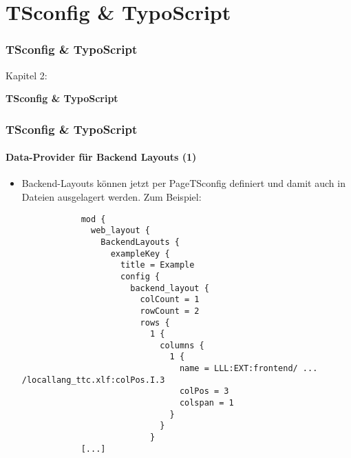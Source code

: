 %

\section{TSconfig \& TypoScript}
\begin{frame}[fragile]
	\frametitle{TSconfig \& TypoScript}

	\begin{center}\huge{Kapitel 2:}\end{center}
	\begin{center}\huge{\color{typo3darkgrey}\textbf{TSconfig \& TypoScript}}\end{center}

\end{frame}


\begin{frame}[fragile]
	\frametitle{TSconfig \& TypoScript}
	\framesubtitle{Data-Provider für Backend Layouts (1)}

	\lstset{basicstyle=\tiny\ttfamily}

	\begin{itemize}
		\item Backend-Layouts können jetzt per PageTSconfig definiert und damit auch in Dateien ausgelagert werden. Zum Beispiel:

		\begin{lstlisting}
			mod {
			  web_layout {
			    BackendLayouts {
			      exampleKey {
			        title = Example
			        config {
			          backend_layout {
			            colCount = 1
			            rowCount = 2
			            rows {
			              1 {
			                columns {
			                  1 {
			                    name = LLL:EXT:frontend/ ... /locallang_ttc.xlf:colPos.I.3
			                    colPos = 3
			                    colspan = 1
			                  }
			                }
			              }
			[...]
		\end{lstlisting}

	\end{itemize}

\end{frame}

